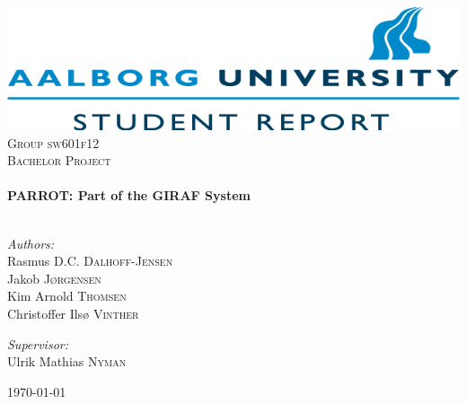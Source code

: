 \begin{nopagebreak}

\begin{center}

\includegraphics[width=\textwidth]{input/Images/aaulogo_study2}\\[1cm]    

\textsc{\LARGE Group sw601f12}\\[1.5cm]

\textsc{\Large Bachelor Project}\\[0.5cm]


\HRule \\[0.4cm]
{ \huge \bfseries PARROT: Part of the GIRAF System}\\[0.4cm]

\HRule \\[1.5cm]

\begin{minipage}{0.4\textwidth}
\begin{flushleft} \large
\vspace{1.25cm}
\emph{Authors:}\\
Rasmus D.C. \textsc{Dalhoff-Jensen} \\
Jakob \textsc{J\o{}rgensen} \\
Kim Arnold \textsc{Thomsen}\\
Christoffer Ils\o{} \textsc{Vinther}

\end{flushleft}
\end{minipage}
\begin{minipage}{0.4\textwidth}
\begin{flushright} \large
\emph{Supervisor:} \\
Ulrik Mathias \textsc{Nyman}
\end{flushright}
\end{minipage}

\vfill

{\large \today}

\end{center}

\end{nopagebreak}
